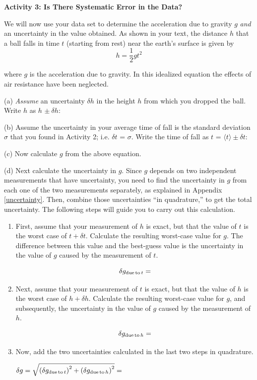 \textbf{Activity 3: Is There Systematic Error in the Data? }

We will now use your data set to determine the acceleration due to gravity $g$ 
\emph{and} an uncertainty in the value obtained. As shown in your text, 
the distance $h$ that a ball falls in time $t$ (starting from rest) near the 
earth's surface is given by
\[
h=\frac{1}{2}gt^{2}\]


where $g$ is the acceleration due to gravity. In this idealized equation the 
effects of air resistance have been neglected. 

(a) \emph{Assume} an uncertainty $\delta h$ in the height $h$ from 
which you dropped the ball. 
Write $h$ as $h$ \(\pm\ \delta h\):
\vspace{7mm}

(b) Assume the uncertainty in your average time of fall is the standard 
deviation \( \sigma  \) that you found in Activity 2; i.e. $\delta t$ = \(\sigma \).  Write the time of fall 
as $t$ = \(\langle t\rangle \pm  \delta t  \):
\vspace{7mm}

(c) Now calculate $g$ from the above equation.
\vspace{15mm}

(d) Next calculate the uncertainty in $g$. Since $g$ depends on two independent measurements that have uncertainty, you need to find the uncertainty in $g$ from each one of the two measurements separately, as explained in Appendix \ref{uncertainty}. Then, combine those uncertainties ``in quadrature,'' to get the total uncertainty. The following steps will guide you to carry out this calculation.
\begin {enumerate}
\item  First, assume that your measurement of $h$  is exact, but that the value of $t$  is the worst case of $t + \delta t$. Calculate the resulting worst-case value for $g$. The difference between this value and the best-guess value is the uncertainty in the value of $g$ caused by the measurement of $t$. 

\vspace {20mm}
$$
\delta g_{ {\rm due\, to\,} t} =
$$

\item  Next, assume that your measurement of $t$ is exact, but that the value of $h$ is the worst case of $h+ \delta h$. Calculate the resulting worst-case value for $g$, and subsequently, the uncertainty in the value of $g$ caused by the measurement of $h$.

\vspace {12mm}
$$
\delta g_{ {\rm due\, to\,} h}=
$$


\item Now, add the two uncertainties calculated in the last two steps in quadrature.

\vspace{4mm}
\hspace {5mm} $\delta g = \sqrt{ \left(\delta g_{{\rm due\, to\,} t}\right)^2 + \left(\delta g_{{\rm due\, to\,} h}\right)^2 } =$

\end {enumerate}


